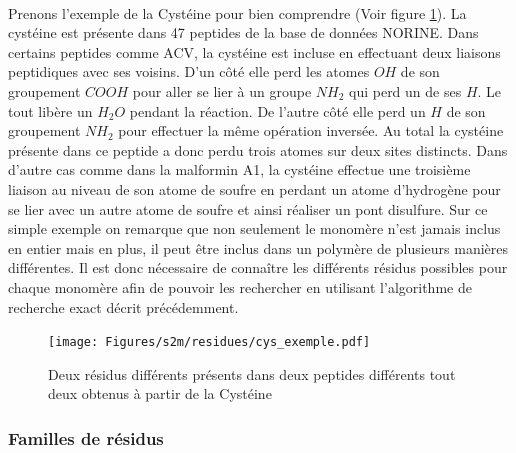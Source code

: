 \documentclass[12pt,french,twoside]{report}
\begin{document}
\paragraph{}Prenons l'exemple de la Cystéine pour bien comprendre (Voir figure \ref{cys_ex}).
La cystéine est présente dans 47 peptides de la base de données
NORINE. Dans certains peptides comme ACV, la cystéine est incluse en effectuant deux liaisons peptidiques avec ses voisins. D'un
côté elle perd les atomes $OH$ de son groupement $COOH$ pour aller se lier à un groupe $NH_2$ qui perd un de ses $H$. Le tout
libère un $H_2O$ pendant la réaction. De l'autre côté elle perd un $H$ de son groupement $NH_2$ pour effectuer la même opération
inversée. Au total la cystéine présente dans ce peptide a donc perdu trois atomes sur deux sites distincts. Dans d'autre cas
comme dans la malformin A1, la cystéine effectue une troisième liaison au niveau de son atome de soufre en perdant un atome 
d'hydrogène pour se lier avec un autre atome de soufre et ainsi réaliser un pont disulfure. Sur ce simple exemple on remarque que
non seulement le monomère n'est jamais inclus en entier mais en plus, il peut être inclus dans un polymère de plusieurs manières
différentes. Il est donc nécessaire de connaître les différents résidus possibles pour chaque monomère afin de pouvoir les
rechercher en utilisant l'algorithme de recherche exact décrit précédemment.

\begin{figure}
  \texttt{[image: Figures/s2m/residues/cys\_exemple.pdf]}
  \caption{\label{cys_ex}Deux résidus différents présents dans deux peptides différents tout deux obtenus à partir de la Cystéine}
\end{figure}


\subsubsection{Familles de résidus}
\end{document}
